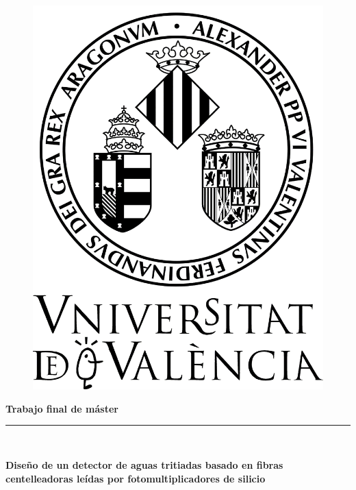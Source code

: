 \begin{titlepage}
\begin{center}
\begin{figure}[htb]
\begin{center}
\includegraphics[scale=0.1]{Logo2.jpg} 
\end{center}
\end{figure}
\vspace*{1 cm}

\begin{large}
\textbf{{\large Trabajo final de máster}}\\
\rule{80mm}{0.1mm}\\

\end{large}
\vspace*{0.2in}
\begin{Large}
\textbf{\LARGE Diseño de un detector de aguas tritiadas basado en fibras centelleadoras leídas por fotomultiplicadores de silicio} \\
\end{Large}
\vspace*{1 cm}


\end{center}
\end{titlepage}
